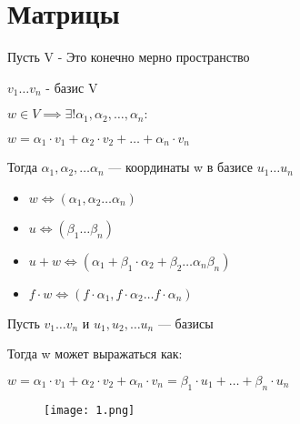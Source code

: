 \section{Матрицы}

\begin{definition}
    Пусть V - Это конечно мерно пространство

    $v_1 \ldots v_n$ - базис V

    $w \in V \implies \exists! \alpha_1, \alpha_2, \ldots, \alpha_n:$

    $w = \alpha_1 \cdot v_1 + \alpha_2 \cdot v_2 + \ldots + \alpha_n \cdot v_n$

    Тогда $\alpha_1, \alpha_2, \ldots \alpha_n$ --- координаты w в базисе $u_1 \ldots u_n$

    \begin{itemize}
        \item $w \Leftrightarrow (\alpha_1, \alpha_2 \ldots \alpha_n)$
        \item $u \Leftrightarrow (\beta_1 \ldots \beta_n)$
        \item $u + w \Leftrightarrow (\alpha_1 + \beta_1 \cdot \alpha_2 + \beta_2 \ldots \alpha_n \beta_n)$
        \item $f \cdot w \Leftrightarrow (f \cdot \alpha_1, f \cdot \alpha_2 \ldots f \cdot \alpha_n)$
    \end{itemize}
\end{definition}


\begin{definition}
    Пусть $v_1 \ldots v_n$ и $u_1, u_2, \ldots u_n$ --- базисы
    
    Тогда w может выражаться как:

    $w = \alpha_1 \cdot v_1 + \alpha_2 \cdot v_2 + \alpha_n \cdot v_n = \beta_1 \cdot u_1 + \ldots + \beta_n \cdot u_n$
        
\end{definition}

\begin{figure}[H]
    \centering
    \texttt{[image: 1.png]}
    
    
    \label{fig:1}
\end{figure}

